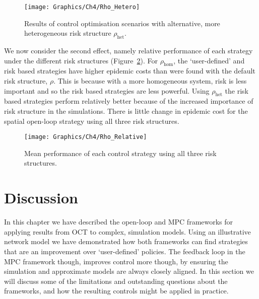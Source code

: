 \begin{figure}[h]
    \begin{center}
        \texttt{[image: Graphics/Ch4/Rho\_Hetero]}
        \caption{Results of control optimisation scenarios with alternative, more heterogeneous risk structure $\rho_{\mathrm{het}}$.}
        \label{fig:ch4:rho_hetero}
    \end{center}
\end{figure}

We now consider the second effect, namely relative performance of each strategy under the different risk structures (Figure~\ref{fig:ch4:rho_relative}). For $\rho_{\mathrm{hom}}$, the `user-defined' and risk based strategies have higher epidemic costs than were found with the default risk structure, $\rho$. This is because with a more homogeneous system, risk is less important and so the risk based strategies are less powerful. Using $\rho_{\mathrm{het}}$ the risk based strategies perform relatively better because of the increased importance of risk structure in the simulations. There is little change in epidemic cost for the spatial open-loop strategy using all three risk structures.

\begin{figure}[h]
    \begin{center}
        \texttt{[image: Graphics/Ch4/Rho\_Relative]}
        \caption{Mean performance of each control strategy using all three risk structures.}
        \label{fig:ch4:rho_relative}
    \end{center}
\end{figure}

\FloatBarrier

\section{Discussion}\label{sec:ch4:Discussion}

In this chapter we have described the open-loop and MPC frameworks for applying results from OCT to complex, simulation models. Using an illustrative network model we have demonstrated how both frameworks can find strategies that are an improvement over `user-defined' policies. The feedback loop in the MPC framework though, improves control more though, by ensuring the simulation and approximate models are always closely aligned. In this section we will discuss some of the limitations and outstanding questions about the frameworks, and how the resulting controls might be applied in practice.

